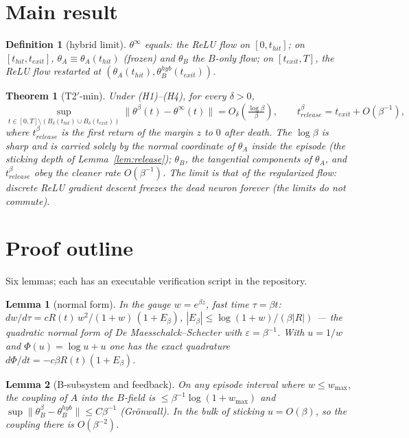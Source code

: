 \documentclass[11pt]{article}
\newtheorem{theorem}{Theorem}
\newtheorem{lemma}{Lemma}
\newtheorem{definition}{Definition}
\begin{document}
\section{Main result}
\begin{definition}[hybrid limit]\label{def:hybrid}
$\theta^\infty$ equals: the ReLU flow on $[0,t_{hit}]$; on $[t_{hit},t_{exit}]$,
$\theta_A\equiv\theta_A(t_{hit})$ (frozen) and $\theta_B$ the $B$-only flow; on
$[t_{exit},T]$, the ReLU flow restarted at
$(\theta_A(t_{hit}),\theta_B^{hyb}(t_{exit}))$.
\end{definition}

\begin{theorem}[T2$'$-min]\label{thm:main}
Under (H1)--(H4), for every $\delta>0$,
\[
\sup_{t\in[0,T]\setminus(B_\delta(t_{hit})\cup B_\delta(t_{exit}))}
\|\theta^\beta(t)-\theta^\infty(t)\| = O_\delta\!\left(\tfrac{\log\beta}{\beta}\right),
\qquad
t^\beta_{release}=t_{exit}+O(\beta^{-1}),
\]
where $t^\beta_{release}$ is the first return of the margin $z$ to $0$ after
death. The $\log\beta$ is sharp and is carried solely by the normal coordinate
of $\theta_A$ inside the episode (the sticking depth of
Lemma~\ref{lem:release}); $\theta_B$, the tangential components of $\theta_A$,
and $t^\beta_{release}$ obey the cleaner rate $O(\beta^{-1})$.
The limit is that of the regularized flow: discrete ReLU gradient descent
freezes the dead neuron forever (the limits do not commute).
\end{theorem}

\section{Proof outline}\label{sec:proof}
Six lemmas; each has an executable verification script in the repository.

\begin{lemma}[normal form]\label{lem:gauge}
In the gauge $w=e^{\beta z}$, fast time $\tau=\beta t$:
$dw/d\tau=cR(t)\,w^2/(1+w)\,(1+E_\beta)$, $|E_\beta|\le\log(1+w)/(\beta|R|)$
--- the quadratic normal form of De Maesschalck--Schecter with
$\varepsilon=\beta^{-1}$. With $u=1/w$ and $\Phi(u)=\log u+u$ one has the exact
quadrature $d\Phi/dt=-c\beta R(t)(1+E_\beta)$.
\end{lemma}

\begin{lemma}[B-subsystem and feedback]\label{lem:gronwall}
On any episode interval where $w\le w_{\max}$, the coupling of $A$ into the
$B$-field is $\le\beta^{-1}\log(1+w_{\max})$ and
$\sup\|\theta_B^\beta-\theta_B^{hyb}\|\le C\beta^{-1}$ (Gr\"onwall). In the bulk
of sticking $u=O(\beta)$, so the coupling there is $O(\beta^{-2})$.
\end{lemma}
\end{document}
